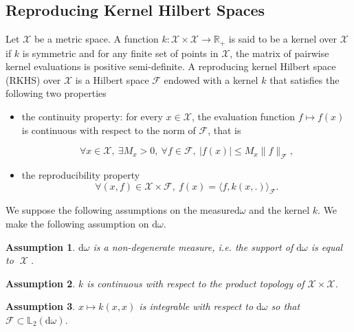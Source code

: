 \documentclass[twoside,11pt]{book}
\newtheorem{assumption}{Assumption}
\numberwithin{theorem}{chapter}
\numberwithin{definition}{chapter}
\numberwithin{proposition}{chapter}
\numberwithin{corollary}{chapter}
\numberwithin{example}{chapter}
\numberwithin{lemma}{chapter}
\numberwithin{assumption}{chapter}
\numberwithin{equation}{chapter}
\numberwithin{figure}{chapter}
\DeclareMathOperator{\X}{\mathcal{X}}
\begin{document}
\subsection{Reproducing Kernel Hilbert Spaces}\label{subsec:rkhs}
Let $\mathcal{X}$ be a metric space. A function $k: \mathcal{X} \times \mathcal{X} \rightarrow \mathbb{R}_{+}$ is said to be a kernel over $\mathcal{X}$ if $k$ is symmetric and for any finite set of points in $\mathcal{X}$, the matrix of pairwise kernel evaluations is positive semi-definite. A reproducing kernel Hilbert space (RKHS) over $\mathcal{X}$ is a Hilbert space $\mathcal{F}$ endowed with a kernel $k$ that satisfies the following two properties \cite{BeTh11}
\begin{itemize}
\item the continuity property: for every $x \in \mathcal{X}$, the evaluation function $f \mapsto f(x)$ is continuous with respect to the norm of $\mathcal{F}$, that is

\begin{equation}
\forall x \in \mathcal{X}, \: \exists M_{x} >0 , \: \forall f \in \mathcal{F}, \: |f(x)| \leq M_{x} \|f\|_{\mathcal{F}},\nonumber
\end{equation} 
\item the reproducibility property\begin{equation}
\forall (x,f) \in \mathcal{X}\times\mathcal{F}, \: f(x) = \langle f, k(x,.) \rangle_{\mathcal{F}}. \nonumber
\end{equation}
\end{itemize}
We suppose the following assumptions on the measure$\mathrm{d}\omega$ and the kernel $k$.
We make the following assumption on $\mathrm{d}\omega$.
\begin{assumption}\label{hyp:domega_is_nondegenerate}
$\mathrm{d}\omega$ is a \emph{non-degenerate} measure, i.e. the support of $\mathrm{d}\omega$ is equal to $\X$.
\end{assumption}

\begin{assumption}\label{hyp:k_is_continuous}
$k$ is continuous with respect to the product topology of $\mathcal{X} \times \mathcal{X}$.
\end{assumption}

\begin{assumption}\label{hyp:the_diagonal_k_is_integrable}
$x \mapsto k(x,x)$ is integrable with respect to $\mathrm{d}\omega$ so that $\mathcal{F} \subset \mathbb{L}_{2}(\mathrm{d}\omega)$.
\end{assumption}
\end{document}
